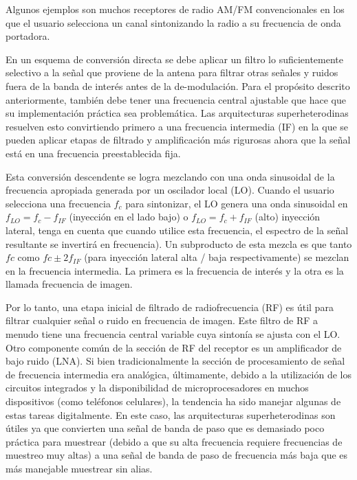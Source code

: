 Algunos ejemplos son muchos receptores de radio AM/FM convencionales en los que el usuario selecciona un canal sintonizando la radio a su frecuencia de onda portadora.

En un esquema de conversión directa se debe aplicar un filtro lo suficientemente selectivo a la señal que proviene de la antena para filtrar otras señales y ruidos fuera de la banda de interés antes de la de-modulación. 
Para el propósito descrito anteriormente, también debe tener una frecuencia central ajustable que hace que su implementación práctica sea problemática. 
Las arquitecturas superheterodinas resuelven esto convirtiendo primero a una frecuencia intermedia (IF) en la que se pueden aplicar etapas de filtrado y amplificación más rigurosas ahora que la señal está en una frecuencia preestablecida fija.

Esta conversión descendente se logra mezclando con una onda sinusoidal de la frecuencia apropiada generada por un oscilador local (LO). 
Cuando el usuario selecciona una frecuencia $f_c$ para sintonizar, el LO genera una onda sinusoidal en $f_{LO} =f_c -f_{IF}$  (inyección en el lado bajo) o $f_{LO} =f_c  + f_{IF}$  (alto) inyección lateral, tenga en cuenta que cuando utilice esta frecuencia, el espectro de la señal resultante se invertirá en frecuencia). Un subproducto de esta mezcla es que tanto $fc$ como $fc\pm 2 f_{IF}$ (para inyección lateral alta / baja respectivamente) se mezclan en la frecuencia intermedia. La primera es la frecuencia de interés y la otra es la llamada frecuencia de imagen.
  

Por lo tanto, una etapa inicial de filtrado de radiofrecuencia (RF) es útil para filtrar cualquier señal o ruido en frecuencia de imagen. 
Este filtro de RF a menudo tiene una frecuencia central variable cuya sintonía se ajusta con el LO. 
Otro componente común de la sección de RF del receptor es un amplificador de bajo ruido (LNA).
Si bien tradicionalmente la sección de procesamiento de señal de frecuencia intermedia era analógica, últimamente, debido a la utilización de los circuitos integrados y la disponibilidad de microprocesadores en muchos dispositivos (como teléfonos celulares), la tendencia ha sido manejar algunas de estas tareas digitalmente. 
En este caso, las arquitecturas superheterodinas son útiles ya que convierten una señal de banda de paso que es demasiado poco práctica para muestrear (debido a que su alta frecuencia requiere frecuencias de muestreo muy altas) a una señal de banda de paso de frecuencia más baja que es más manejable muestrear sin alias.